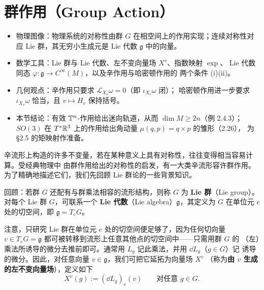 \section{群作用（Group Action）}

\begin{keytakeaways}
\begin{itemize}
  \item 物理图像：物理系统的对称性由群 $G$ 在相空间上的作用实现；连续对称性对应
        Lie 群，其无穷小生成元是 Lie 代数 $\mathfrak{g}$ 中的向量。
  \item 数学工具：Lie 群与 Lie 代数、左不变向量场 $X^v$、指数映射 $\exp$、
        Lie 代数同态 $\varphi:\mathfrak{g}\to C^\infty(M)$，以及辛作用与哈密顿作用的
        两个条件 (i)(ii)。
  \item 几何观点：辛作用只要求 $\mathcal{L}_{X_v}\omega=0$（即 $\iota_{X_v}\omega$ 闭）；
        哈密顿作用进一步要求 $\iota_{X_v}\omega$ 恰当，且 $v\mapsto H_v$ 保持括号。
  \item 本节结论：有效 $\mathbb{T}^n$-作用给出迷向轨道，从而 $\dim M\ge2n$（例 2.4.3）；
        $SO(3)$ 在 $T^*\mathbb{R}^3$ 上的作用给出角动量 $\mu(q,p)=q\times p$ 的雏形（2.26），
        为 §2.5 的矩映射作准备。
\end{itemize}
\end{keytakeaways}

辛流形上构造的许多不变量，若在某种意义上具有对称性，往往变得相当容易计算。受经典物理中
由群作用给出的对称性的启发，有一大类辛流形容许群作用。为了精确地描述它们，我们先回顾
Lie 群论的一些背景知识。

回顾：若群 $G$ 还配有与群乘法相容的流形结构，则称 $G$ 为 \textbf{Lie 群}（Lie group）。
对每个 Lie 群 $G$，可联系一个 \textbf{Lie 代数}（Lie algebra）$\mathfrak{g}$，其定义为
$G$ 在单位元 $e$ 处的切空间，即 $\mathfrak{g}=T_eG$。

注意，只研究 Lie 群在单位元 $e$ 处的切空间便足够了，因为任何切向量
$v\in T_eG=\mathfrak{g}$ 都可被转移到流形上任意其他点的切空间中——只需用群 $G$ 的
（左）乘法所诱导的微分去推前即可。通常用 $L_g$ 记此乘法，并用 $\dd L_g$（$g\in G$）记
诱导的微分。因此，对任意向量 $v\in\mathfrak{g}$，我们可把它延拓为向量场 $X^v$
（称为\textbf{由 $v$ 生成的左不变向量场}），定义如下
\begin{equation}
  X^v(g):=(\dd L_g)_e(v)\qquad\text{对任意 } g\in G .
  \tag{2.18}
\end{equation}


